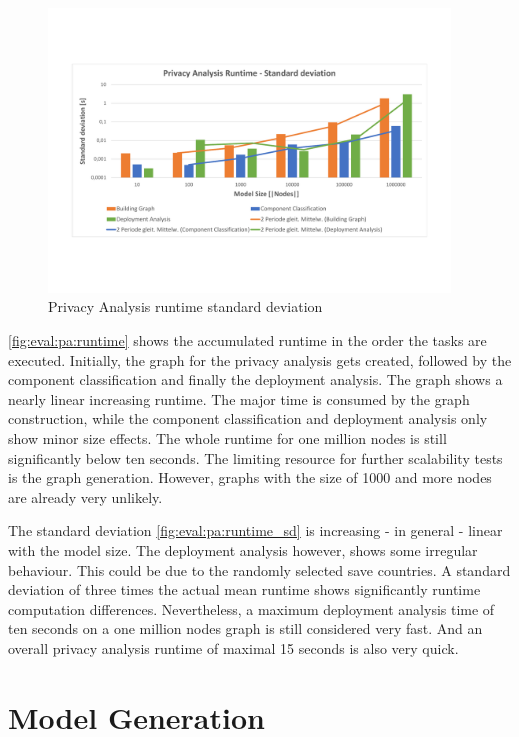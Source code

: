 \begin{figure}[h]
	\centering
	\includegraphics[trim = 5mm 30mm 10mm 30mm, clip, width=0.95\textwidth]{graphs/Runtime_pa_sd}
	\caption{Privacy Analysis runtime standard deviation}
	\label{fig:eval:pa:runtime_sd}
\end{figure}

\autoref{fig:eval:pa:runtime} shows the accumulated runtime in the order the tasks are executed. Initially, the graph for the privacy analysis gets created, followed by the component classification and finally the deployment analysis. The graph shows a nearly linear increasing runtime. The major time is consumed by the graph construction, while the component classification and deployment analysis only show minor size effects. The whole runtime for one million nodes is still significantly below ten seconds. The limiting resource for further scalability tests is the graph generation. However, graphs with the size of 1000 and more nodes are already very unlikely.

The standard deviation \autoref{fig:eval:pa:runtime_sd} is increasing - in general - linear with the model size. The deployment analysis however, shows some irregular behaviour. This could be due to the randomly selected save countries. A standard deviation of three times the actual mean runtime shows significantly runtime computation differences. Nevertheless, a maximum deployment analysis time of ten seconds on a one million nodes graph is still considered very fast. And an overall privacy analysis runtime of maximal 15 seconds is also very quick.


\section{Model Generation}
\label{sec:Evaluation:generation}

